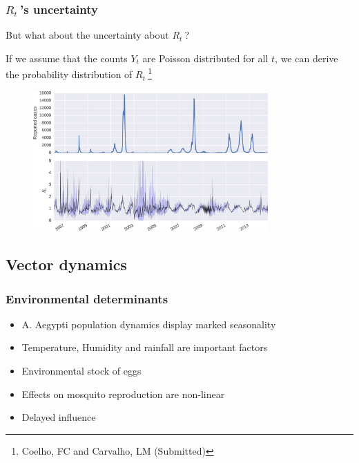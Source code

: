 \documentclass[10pt,compress,notheorems]{beamer}
\def \rr {$R_{t}\:$}
\begin{document}
\begin{frame}
\frametitle{\rr's uncertainty}
But what about the uncertainty about \rr?

If we assume that the counts $Y_t$ are Poisson distributed for all $t$, we can 
derive the probability distribution of \rr\footnote{Coelho, FC and Carvalho, LM 
(Submitted)}
\begin{center}
\begin{figure}
  \includegraphics[width=9cm]{./rt_series.png}
\end{figure}
\end{center}


\end{frame}


\subsection{Vector dynamics}
\begin{frame}
\frametitle{Environmental determinants}
\begin{itemize}[<+->]
 \item A. Aegypti population dynamics display marked seasonality
 \item Temperature, Humidity and rainfall are important factors
 \item Environmental stock of eggs
 \item Effects on mosquito reproduction are non-linear
 \item Delayed influence
\end{itemize}

\end{frame}
\end{document}
